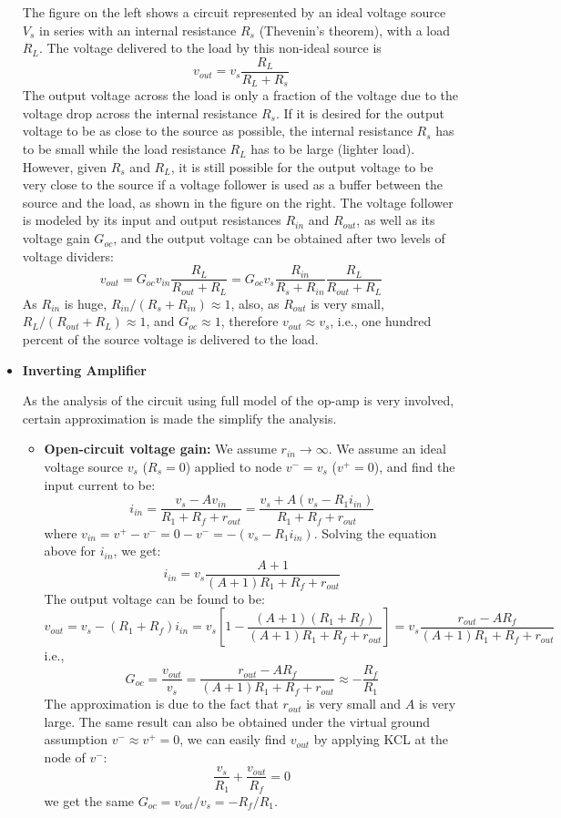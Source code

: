 \begin{itemize}
  The figure on the left shows a circuit represented by an ideal voltage
  source $V_s$ in series with an internal resistance $R_s$ (Thevenin's
  theorem), with a load $R_L$. The voltage delivered to the load by this
  non-ideal source is
  \[ v_{out}=v_s \frac{R_L}{R_L+R_s} \]
  The output voltage across the load is only a fraction of the voltage due to 
  the voltage drop across the internal resistance $R_s$. If it is desired for
  the output voltage to be as close to the source as possible, the internal 
  resistance $R_s$ has to be small while the load resistance $R_L$ has to be
  large (lighter load). However, given $R_s$ and $R_L$, it is still possible
  for the output voltage to be very close to the source if a voltage follower
  is used as a buffer between the source and the load, as shown in the figure
  on the right. The voltage follower is modeled by its input and output
  resistances $R_{in}$ and $R_{out}$, as well as its voltage gain $G_{oc}$,
  and the output voltage can be obtained after two levels of voltage dividers:
  \[ v_{out}=G_{oc} v_{in} \frac{R_L}{R_{out}+R_L}=
  G_{oc} v_s \frac{R_{in}}{R_s+R_{in}}   \frac{R_L}{R_{out}+R_L} \]
  As $R_{in}$ is huge, $R_{in}/(R_s+R_{in})\approx 1$, also, as $R_{out}$
  is very small, $R_L/(R_{out}+R_L) \approx 1$, and $G_{oc} \approx 1$,
  therefore $v_{out} \approx v_s$, i.e., one hundred percent of the source
  voltage is delivered to the load.  

\item {\bf Inverting Amplifier}


  As the analysis of the circuit using full model of the op-amp is very involved,
  certain approximation is made the simplify the analysis.
  \begin{itemize}
    \item {\bf Open-circuit voltage gain:} 
      We assume $r_{in}\rightarrow \infty$. We assume an ideal voltage source $v_s$ 
      ($R_s=0$) applied to node $v^-=v_s$ ($v^+=0$), and find the input current to be:
      \[ i_{in}=\frac{v_s-Av_{in}}{R_1+R_f+r_{out}}
      =\frac{v_s+A(v_s-R_1 i_{in})}{R_1+R_f+r_{out}} \]
      where $v_{in}=v^+-v^-=0-v^-=-(v_s-R_1 i_{in})$. Solving the equation above for 
      $i_{in}$, we get:
      \[ i_{in}=v_s \frac{A+1}{(A+1)R_1+R_f+r_{out}} \]
      The output voltage can be found to be:
      \[ v_{out}=v_s-(R_1+R_f) i_{in}
      =v_s\left[1-\frac{(A+1)(R_1+R_f)}{(A+1)R_1+R_f+r_{out}}\right] 
      =v_s\frac{r_{out}-AR_f}{(A+1)R_1+R_f+r_{out}} \] 
      i.e., 
      \[ G_{oc}=\frac{v_{out}}{v_s}=\frac{r_{out}-AR_f}{(A+1)R_1+R_f+r_{out}} 
      \approx - \frac{R_f}{R_1} \]
      The approximation is due to the fact that $r_{out}$ is very small and $A$
      is very large. The same result can also be obtained under the virtual ground
      assumption $v^-\approx v^+=0$, we can easily find $v_{out}$ by applying KCL at
      the node of $v^-$:
      \[ \frac{v_s}{R_1}+\frac{v_{out}}{R_f} = 0 \]
      we get the same $G_{oc}=v_{out}/v_s=-R_f/R_1$.


\end{itemize}
\end{itemize}
